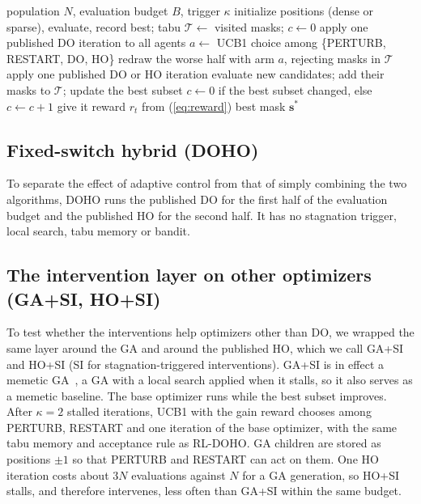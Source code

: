 \documentclass[journal]{IEEEtran}
\begin{document}
\begin{algorithm}[t]
\caption{RL-DOHO}\label{alg:rldoho}
\small
\begin{algorithmic}[1]
\Require population $N$, evaluation budget $B$, trigger $\kappa$
\State initialize positions (dense or sparse), evaluate, record best; tabu $\mathcal{T}\leftarrow$ visited masks; $c\leftarrow0$
   \State apply one published DO iteration to all agents
  \Else \State $a\leftarrow$ UCB1 choice among \{PERTURB, RESTART, DO, HO\}
     \State redraw the worse half with arm $a$, rejecting masks in $\mathcal{T}$
    \Else \State apply one published DO or HO iteration \EndIf
  \EndIf
  \State evaluate new candidates; add their masks to $\mathcal{T}$; update the best subset
  \State $c\leftarrow0$ if the best subset changed, else $c\leftarrow c+1$
   \State give it reward $r_t$ from (\ref{eq:reward}) \EndIf
\EndWhile
\Ensure best mask $\mathbf{s}^\ast$
\end{algorithmic}
\end{algorithm}

\subsection{Fixed-switch hybrid (DOHO)}
To separate the effect of adaptive control from that of simply combining the two algorithms, DOHO runs the published DO for the first half of the evaluation budget and the published HO for the second half. It has no stagnation trigger, local search, tabu memory or bandit.

\subsection{The intervention layer on other optimizers (GA+SI, HO+SI)}
To test whether the interventions help optimizers other than DO, we wrapped the same layer around the GA and around the published HO, which we call GA+SI and HO+SI (SI for stagnation-triggered interventions). GA+SI is in effect a memetic GA~\cite{moscato1989}, a GA with a local search applied when it stalls, so it also serves as a memetic baseline. The base optimizer runs while the best subset improves. After $\kappa=2$ stalled iterations, UCB1 with the gain reward chooses among PERTURB, RESTART and one iteration of the base optimizer, with the same tabu memory and acceptance rule as RL-DOHO. GA children are stored as positions $\pm1$ so that PERTURB and RESTART can act on them. One HO iteration costs about $3N$ evaluations against $N$ for a GA generation, so HO+SI stalls, and therefore intervenes, less often than GA+SI within the same budget.
\end{document}
